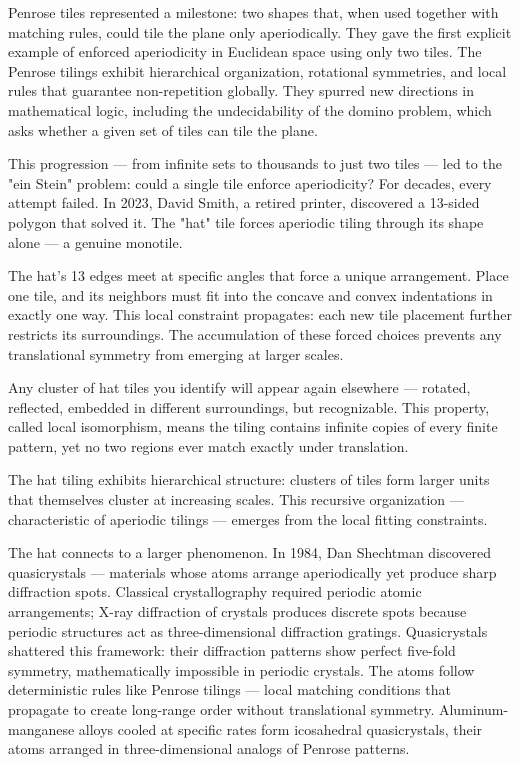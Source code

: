 Penrose tiles represented a milestone: two shapes that, when used together with matching rules, could tile the plane only aperiodically. They gave the first explicit example of enforced aperiodicity in Euclidean space using only two tiles. The Penrose tilings exhibit hierarchical organization, rotational symmetries, and local rules that guarantee non-repetition globally. They spurred new directions in mathematical logic, including the undecidability of the domino problem, which asks whether a given set of tiles can tile the plane.

This progression — from infinite sets to thousands to just two tiles — led to the "ein Stein" problem: could a single tile enforce aperiodicity? For decades, every attempt failed. In 2023, David Smith, a retired printer, discovered a 13-sided polygon that solved it. The "hat" tile forces aperiodic tiling through its shape alone — a genuine monotile.

The hat's 13 edges meet at specific angles that force a unique arrangement. Place one tile, and its neighbors must fit into the concave and convex indentations in exactly one way. This local constraint propagates: each new tile placement further restricts its surroundings. The accumulation of these forced choices prevents any translational symmetry from emerging at larger scales.

Any cluster of hat tiles you identify will appear again elsewhere — rotated, reflected, embedded in different surroundings, but recognizable. This property, called local isomorphism, means the tiling contains infinite copies of every finite pattern, yet no two regions ever match exactly under translation.

The hat tiling exhibits hierarchical structure: clusters of tiles form larger units that themselves cluster at increasing scales. This recursive organization — characteristic of aperiodic tilings — emerges from the local fitting constraints.

The hat connects to a larger phenomenon. In 1984, Dan Shechtman discovered quasicrystals — materials whose atoms arrange aperiodically yet produce sharp diffraction spots. Classical crystallography required periodic atomic arrangements; X-ray diffraction of crystals produces discrete spots because periodic structures act as three-dimensional diffraction gratings. Quasicrystals shattered this framework: their diffraction patterns show perfect five-fold symmetry, mathematically impossible in periodic crystals. The atoms follow deterministic rules like Penrose tilings — local matching conditions that propagate to create long-range order without translational symmetry. Aluminum-manganese alloys cooled at specific rates form icosahedral quasicrystals, their atoms arranged in three-dimensional analogs of Penrose patterns.

